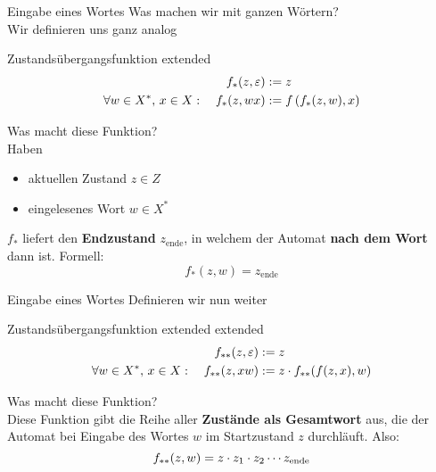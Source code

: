 \begin{frame}{Eingabe eines Wortes}
	Was machen wir mit ganzen Wörtern? \\ \pause
	Wir definieren uns ganz analog
	\begin{block}{Zustandsübergangsfunktion extended}
	\begin{align*}
		 	f_*(z,\varepsilon) &:= z \\
		 	\forall w\in X^* , \, x\in X : \quad  f_*(z,wx) &:= f\left(f_*(z,w),x\right) 
	\end{align*}
	\end{block}
	\pause Was macht diese Funktion? \\ \pause
	\medskip
	Haben
	\begin{itemize}
		\item aktuellen Zustand $z \in Z$
		\item eingelesenes Wort $w \in X^*$
	\end{itemize}
	\impl $f_*$ liefert den \textbf{Endzustand} $z_\text{ende}$, in welchem der Automat \textbf{nach dem Wort} dann ist.
	Formell: $$ f_*(z,w) = z_\text{ende} $$
\end{frame}
	
\begin{frame}{Eingabe eines Wortes}
	Definieren wir nun weiter 
	\begin{block}{Zustandsübergangsfunktion extended extended}
		\begin{align*}
			f_{**}(z, \varepsilon) &:= z \\
			\forall w\in X^* , \, x\in X : \quad  f_{**}(z, xw)   &:= z \cdot f_{**}\!\left(f(z,x),w\right) \\
		\end{align*}
	\end{block}
	\pause Was macht diese Funktion? \\ \pause
	Diese Funktion gibt die Reihe aller \textbf{Zustände als Gesamtwort} aus, die der Automat bei Eingabe des Wortes $w$ im Startzustand $z$ durchläuft. Also: 
	$$ f_{**}(z, w) = z \cdot z_1 \cdot z_2 \cdots z_\text{ende} $$
\end{frame}

